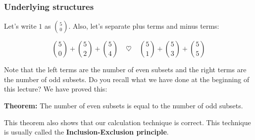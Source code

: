 \begin{frame}\frametitle{Underlying structures}
  Let's write $1$ as ${5\choose 0}$.  Also, let's separate plus terms
  and minus terms:

  $${5\choose 0} + {5\choose 2} + {5\choose 4}
  \ \ \ \ \ \heartsuit \ \ \ \ \
  {5\choose 1} + {5\choose 3} + {5\choose 5}$$

  \pause
  \vspace{0.1in}
  Note that the left terms are the number of even subsets and the
  right terms are the number of odd subsets.  Do you recall what we have done at the beginning of this lecture?
  \pause We have proved this:

  \begin{tcolorbox}
    {\bf Theorem:} The number of even subsets is equal to the number
    of odd subsets.
  \end{tcolorbox}

  This theorem also shows that our calculation technique is correct.
  This technique is usually called the {\bf Inclusion-Exclusion
    principle}.
\end{frame}
